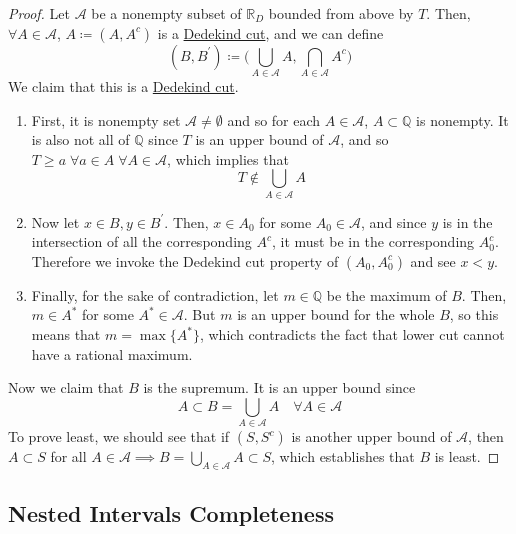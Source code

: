  \begin{proof}
    Let $\mathcal{A}$ be a nonempty subset of $\mathbb{R}_D$ bounded from above by $T$. Then, $\forall A \in \mathcal{A}$, $A \coloneqq (A, A^c)$ is a \hyperref[def:dedekind-cut]{Dedekind cut}, and we can define
    \begin{equation}
      (B, B^\prime) \coloneqq \bigg( \bigcup_{A \in \mathcal{A}} A, \bigcap_{A \in \mathcal{A}} A^c \bigg)
    \end{equation} 
    We claim that this is a \hyperref[def:dedekind-cut]{Dedekind cut}. 
    \begin{enumerate}
      \item First, it is nonempty set $\mathcal{A} \neq \emptyset$ and so for each $A \in \mathcal{A}$, $A \subset \mathbb{Q}$ is nonempty. It is also not all of $\mathbb{Q}$ since $T$ is an upper bound of $\mathcal{A}$, and so $T \geq a \; \forall a \in A \; \forall A \in \mathcal{A}$, which implies that 
      \begin{equation}
        T \not\in \bigcup_{A \in \mathcal{A}} A
      \end{equation}

      \item Now let $x \in B, y \in B^\prime$. Then, $x \in A_0$ for some $A_0 \in \mathcal{A}$, and since $y$ is in the intersection of all the corresponding $A^c$, it must be in the corresponding $A_0^c$. Therefore we invoke the Dedekind cut property of $(A_0, A_0^c)$ and see $x < y$. 

      \item Finally, for the sake of contradiction, let $m \in \mathbb{Q}$ be the maximum of $B$. Then, $m \in A^\ast$ for some $A^\ast \in \mathcal{A}$. But $m$ is an upper bound for the whole $B$, so this means that $m = \max\{A^\ast\}$, which contradicts the fact that lower cut cannot have a rational maximum. 
    \end{enumerate}
    Now we claim that $B$ is the supremum. It is an upper bound since 
    \begin{equation}
      A \subset B = \bigcup_{A \in \mathcal{A}} A \quad \forall A \in \mathcal{A}
    \end{equation}
    To prove least, we should see that if $(S, S^c)$ is another upper bound of $\mathcal{A}$, then $A \subset S$ for all $A \in \mathcal{A} \implies B = \bigcup_{A \in \mathcal{A}} A \subset S$, which establishes that $B$ is least. 
  \end{proof}

\subsection{Nested Intervals Completeness}

